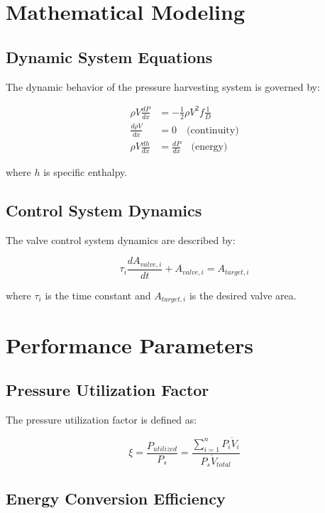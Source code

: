 \documentclass[12pt,a4paper]{article}
\begin{document}
\section{Mathematical Modeling}

\subsection{Dynamic System Equations}

The dynamic behavior of the pressure harvesting system is governed by:

\begin{align}
\rho V \frac{dP}{dx} &= -\frac{1}{2}\rho V^2 f \frac{1}{D} \\
\frac{d\rho V}{dx} &= 0 \quad \text{(continuity)} \\
\rho V \frac{dh}{dx} &= \frac{dP}{dx} \quad \text{(energy)}
\end{align}

where $h$ is specific enthalpy.

\subsection{Control System Dynamics}

The valve control system dynamics are described by:

\begin{equation}
\tau_i \frac{dA_{valve,i}}{dt} + A_{valve,i} = A_{target,i}
\end{equation}

where $\tau_i$ is the time constant and $A_{target,i}$ is the desired valve area.

\section{Performance Parameters}

\subsection{Pressure Utilization Factor}

The pressure utilization factor is defined as:

\begin{equation}
\xi = \frac{P_{utilized}}{P_s} = \frac{\sum_{i=1}^{n} P_i \dot{V}_i}{P_s \dot{V}_{total}}
\end{equation}

\subsection{Energy Conversion Efficiency}
\end{document}
